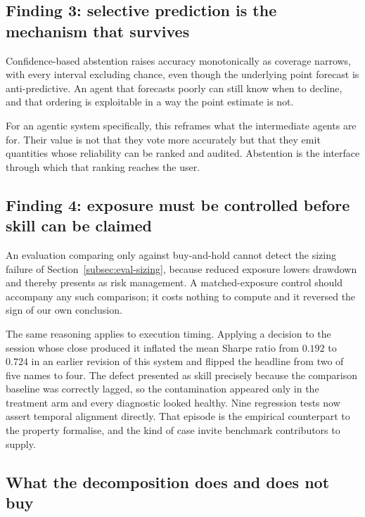 \documentclass[pdflatex,sn-apa]{sn-jnl}%
\theoremstyle{thmstyleone}%
\theoremstyle{thmstyletwo}%
\theoremstyle{thmstylethree}%
\begin{document}
\subsection{Finding 3: selective prediction is the mechanism that
survives}\label{subsec:disc-abstention}

Confidence-based abstention raises accuracy monotonically as coverage narrows,
with every interval excluding chance, even though the underlying point forecast
is anti-predictive. An agent that forecasts poorly can still know when to
decline, and that ordering is exploitable in a way the point estimate is not.

For an agentic system specifically, this reframes what the intermediate agents
are for. Their value is not that they vote more accurately but that they emit
quantities whose reliability can be ranked and audited. Abstention is the
interface through which that ranking reaches the user.

\subsection{Finding 4: exposure must be controlled before skill can be
claimed}\label{subsec:disc-eval}

An evaluation comparing only against buy-and-hold cannot detect the sizing
failure of Section~\ref{subsec:eval-sizing}, because reduced exposure lowers
drawdown and thereby presents as risk management. A matched-exposure control
should accompany any such comparison; it costs nothing to compute and it
reversed the sign of our own conclusion.

The same reasoning applies to execution timing. Applying a decision to the
session whose close produced it inflated the mean Sharpe ratio from $0.192$ to
$0.724$ in an earlier revision of this system and flipped the headline from two
of five names to four. The defect presented as skill precisely because the
comparison baseline was correctly lagged, so the contamination appeared only in
the treatment arm and every diagnostic looked healthy. Nine regression tests now
assert temporal alignment directly. That episode is the empirical counterpart
to the property \citet{fonseca2026lookahead} formalise, and the kind of case
\citet{benhenda2026lookaheadbench} invite benchmark contributors to supply.

\subsection{What the decomposition does and does not
buy}\label{subsec:disc-agents}
\end{document}
